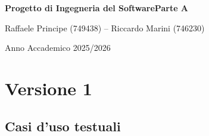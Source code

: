 \documentclass[12pt, a4paper, oneside]{report}
\begin{document}
\begin{titlepage}
    \centering
    \null \vfill
    {\huge\bfseries Progetto di Ingegneria del Software\newline Parte A\par}
    {\Large Raffaele Principe (749438) -- Riccardo Marini (746230)\par}
    {\large Anno Accademico 2025/2026\par}
    \vfill
\end{titlepage}

\tableofcontents 
\clearpage

\chapter{Versione 1}

\section{Casi d'uso testuali}

\renewcommand{\arraystretch}{1.4} 
\end{document}
